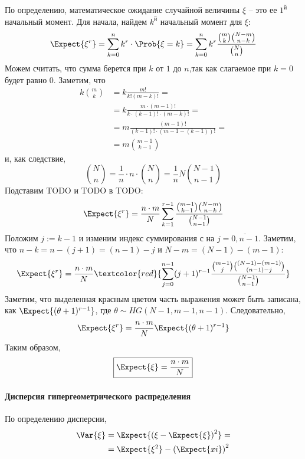 По определению, математическое ожидание случайной величины \(\xi\) --
это ее \(1^\text{й}\) начальный момент. Для начала, найдем
\(k^\text{й}\) начальный момент для \(\xi\): \[\Expect{\xi^r}
= \sum_{k=0}^{n} k^r \cdot \Prob{\xi=k}
= \sum_{k=0}^{n} k^r\frac{\binom{m}{k}\binom{N-m}{n-k}}{\binom{N}{n}}\]
Можем считать, что сумма берется при \(k\) от \(1\) до \(n\),так как
слагаемое при \(k=0\) будет равно \(0\). Заметим, что \[\begin{aligned}
    k\binom{m}{k} &= k \frac{m!}{k!(m-k)!} =\\
                &= k \frac{m \cdot (m-1)!}{k \cdot (k-1)! \cdot (m-k)!} =\\
                &= m \frac{(m-1)!}{(k-1)! \cdot (m-1 - (k-1))!} =\\
                &= m \binom{m-1}{k-1}
\end{aligned}\] и, как следствие, \[\binom{N}{n}
= \frac{1}{n} \cdot n \cdot \binom{N}{n}
= \frac{1}{n} N \binom{N-1}{n-1}\] Подставим TODO и TODO в TODO:
\[\Expect{\xi^r} = \frac{n \cdot m}{N}
\sum_{k=1}^{r-1} \frac{\binom{m-1}{k-1}\binom{N-m}{n-k}}{\binom{N-1}{n-1}}\]
Положим \(j := k-1\) и изменим индекс суммирования с на
\(j = \overline{0, n-1}\). Заметим, что
\(n - k = n - (j+1) = (n-1) - j\) и \(N - m = (N-1) - (m-1)\):
\[\Expect{\xi^r} = \frac{n \cdot m}{N} \textcolor{red}{\sum_{j=0}^{n-1} (j+1)^{r-1}
\frac{\binom{m-1}{j}\binom{(N-1) - (m-1)}{(n-1) - j}}{\binom{N-1}{n-1}}}\]
Заметим, что выделенная красным цветом часть выражения может быть
записана, как \(\Expect{(\theta+1)^{r-1}}\), где
\(\theta \sim HG(N-1, m-1, n-1)\). Следовательно,
\[\Expect{\xi^r} = \frac{n \cdot m}{N} \Expect{(\theta+1)^{r-1}}\] Таким
образом, \[\boxed{
    \Expect{\xi} = \frac{n \cdot m}{N}
}\]

\hypertarget{ux434ux438ux441ux43fux435ux440ux441ux438ux44f-ux433ux438ux43fux435ux440ux433ux435ux43eux43cux435ux442ux440ux438ux447ux435ux441ux43aux43eux433ux43e-ux440ux430ux441ux43fux440ux435ux434ux435ux43bux435ux43dux438ux44f}{%
\paragraph{Дисперсия гипергеометрического
распределения}\label{ux434ux438ux441ux43fux435ux440ux441ux438ux44f-ux433ux438ux43fux435ux440ux433ux435ux43eux43cux435ux442ux440ux438ux447ux435ux441ux43aux43eux433ux43e-ux440ux430ux441ux43fux440ux435ux434ux435ux43bux435ux43dux438ux44f}}

По определению дисперсии, \[\begin{aligned}
    \Var{\xi} &= \Expect{\left(\xi - \Expect{\xi}\right)^2} =\\
              &= \Expect{\xi^2} - \left(\Expect{xi}\right)^2
\end{aligned}\]

